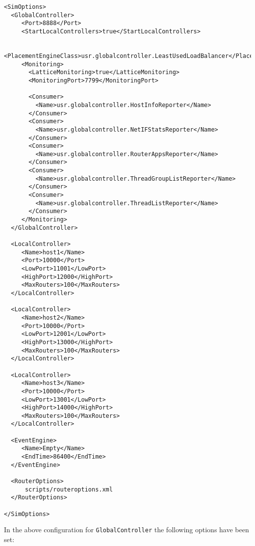 \begin{lstlisting}[language=config, caption=control-wait-config.xml]
<SimOptions>
  <GlobalController>
     <Port>8888</Port>
     <StartLocalControllers>true</StartLocalControllers>

     <PlacementEngineClass>usr.globalcontroller.LeastUsedLoadBalancer</PlacementEngineClass>
     <Monitoring>
       <LatticeMonitoring>true</LatticeMonitoring>
       <MonitoringPort>7799</MonitoringPort>

       <Consumer> 
         <Name>usr.globalcontroller.HostInfoReporter</Name>
       </Consumer>
       <Consumer>
         <Name>usr.globalcontroller.NetIFStatsReporter</Name>
       </Consumer>
       <Consumer>
         <Name>usr.globalcontroller.RouterAppsReporter</Name>
       </Consumer>
       <Consumer>
         <Name>usr.globalcontroller.ThreadGroupListReporter</Name>
       </Consumer>
       <Consumer>
         <Name>usr.globalcontroller.ThreadListReporter</Name>
       </Consumer>
     </Monitoring>
  </GlobalController>

  <LocalController>
     <Name>host1</Name>
     <Port>10000</Port>
     <LowPort>11001</LowPort>
     <HighPort>12000</HighPort>
     <MaxRouters>100</MaxRouters>
  </LocalController>

  <LocalController>
     <Name>host2</Name>
     <Port>10000</Port>
     <LowPort>12001</LowPort>
     <HighPort>13000</HighPort>
     <MaxRouters>100</MaxRouters>
  </LocalController>

  <LocalController>
     <Name>host3</Name>
     <Port>10000</Port>
     <LowPort>13001</LowPort>
     <HighPort>14000</HighPort>
     <MaxRouters>100</MaxRouters>
  </LocalController>

  <EventEngine>
     <Name>Empty</Name>
     <EndTime>86400</EndTime> 
  </EventEngine>

  <RouterOptions>
      scripts/routeroptions.xml
  </RouterOptions>

</SimOptions>

\end{lstlisting}


\noindent  In the above configuration for \texttt{GlobalController}
the following options have been set:

